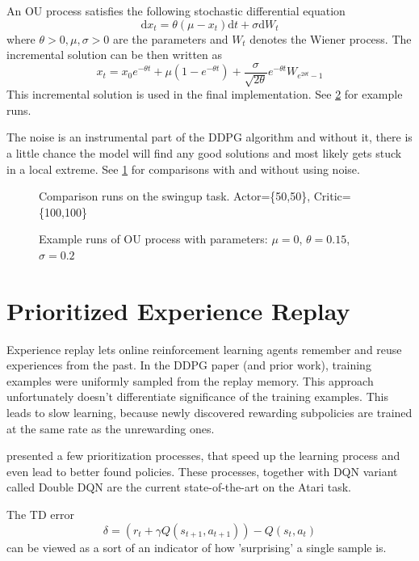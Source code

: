 An OU process satisfies the following stochastic differential equation
\begin{equation}
\text{d}x_t=\theta(\mu-x_t)\text{d}t+\sigma \text{d}W_t
\end{equation}
where $\theta>0 , \mu , \sigma>0$ are the parameters and $W_t$ denotes the Wiener process. The incremental solution can be then written as
\begin{equation}
x_t=x_0 e^{-\theta t}+\mu(1-e^{-\theta t})+\dfrac{\sigma}{\sqrt{2\theta}}e^{-\theta t}W_{e^{2\theta t}-1}
\end{equation}
This incremental solution is used in the final implementation. See \ref{plot:ou} for example runs.

The noise is an instrumental part of the DDPG algorithm and without it, there is a little chance the model will find any good solutions and most likely gets stuck in a local extreme. See \ref{plot:ou-compare} for comparisons with and without using noise.

\begin{figure}[h!]

\caption{Comparison runs on the swingup task. Actor=\{50,50\}, Critic=\{100,100\}}
\centering
\label{plot:ou-compare}
\end{figure}

\begin{figure}[h!]

\caption{Example runs of OU process with parameters: $\mu=0$, $\theta=0.15$, $\sigma=0.2$}
\centering
\label{plot:ou}
\end{figure}

\section{Prioritized Experience Replay}
Experience replay lets online reinforcement learning agents remember and reuse experiences from the past. In the DDPG paper (and prior work), training examples were uniformly sampled from the replay memory. This approach unfortunately doesn't differentiate significance of the training examples. This leads to slow learning, because newly discovered rewarding subpolicies are trained at the same rate as the unrewarding ones.
 
\cite{cite:replay} presented a few prioritization processes, that speed up the learning process and even lead to better found policies. These processes, together with DQN variant called Double DQN are the current state-of-the-art on the Atari task.

The TD error 
\begin{equation}
\delta=\left( r_t + \gamma Q(s_{t+1}, a_{t+1})\right) - Q(s_t,a_t)
\end{equation}
can be viewed as a sort of an indicator of how 'surprising' a single sample is. 

